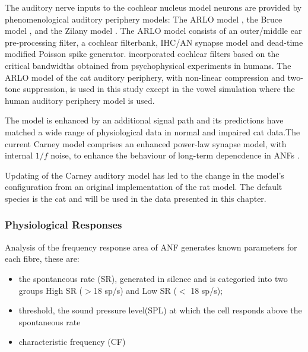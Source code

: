 
The auditory nerve inputs to the cochlear nucleus model neurons are
provided by phenomenological auditory periphery models: The ARLO model
\citep{HeinzZhangEtAl:2001}, the Bruce model
\citep{BruceSachsEtAl:2003,ZilanyBruce:2006,ZilanyBruce:2007}, and the
Zilany model \citep{ZilanyBruceEtAl:2009}. The ARLO model consists of
an outer/middle ear pre-processing filter, a cochlear filterbank,
IHC/AN synapse model and dead-time modified Poisson spike
generator. \citep{HeinzZhangEtAl:2001} incorporated cochlear filters
based on the critical bandwidths obtained from psycho\-physical
experiments in humans. The ARLO model of the cat auditory periphery,
with non-linear compression and two-tone suppression, is used in this
study except in the vowel simulation where the human auditory
periphery model is used.

\medskip{}

The \citet{ZilanyBruce:2007} model is enhanced by an additional signal
path and its predictions have matched a wide range of physiological
data in normal and impaired cat data.The current Carney model
comprises an enhanced power-law synapse model, with internal $1/f$
noise, to enhance the behaviour of long-term depencdence in ANFs
\citep{ZilanyBruceEtAl:2009}.

\medskip{}

 Updating of the Carney auditory model has led to the
change in the model's configuration from an original implementation of
the rat model.  The default species is the cat and will be used in the
data presented in this chapter.

\subsubsection{Physiological Responses}

Analysis of the frequency response area of ANF generates known
parameters for each fibre, these are:
\begin{itemize}
\item the spontaneous rate (SR), generated in silence and is
  categoried into two groups High SR ($>$18 sp/s) and Low SR ($<$ 18
  sp/s);
\item threshold, the sound pressure level(SPL) at which the cell
  responds above the spontaneous rate
\item characteristic frequency (CF)
\end{itemize}

